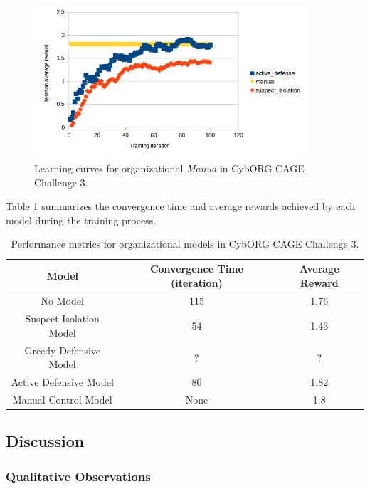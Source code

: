 \documentclass[conference]{IEEEtran}
\begin{document}
\begin{figure}[ht]
    \centering
    \includegraphics[width=0.9\textwidth]{figures/learning_curves.png}
    \caption{Learning curves for organizational \textit{Manua} in CybORG CAGE Challenge 3.}
    \label{fig:learning_curves}
\end{figure}

Table \ref{tab:results} summarizes the convergence time and average rewards achieved by each model during the training process.

\begin{table}[ht]
    \centering
    \begin{tabular}{|c|c|c|}
        \hline
        Model & Convergence Time (iteration) & Average Reward \\
        \hline
        No Model & 115 & 1.76           \\
        Suspect Isolation Model & 54 & 1.43           \\
        Greedy Defensive Model  & ? & ?       \\
        Active Defensive Model  & 80 & 1.82           \\
        Manual Control Model    & None & 1.8 \\
        \hline
    \end{tabular}
    \caption{Performance metrics for organizational models in CybORG CAGE Challenge 3.}
    \label{tab:results}
\end{table}

\subsection{Discussion}

\subsubsection{Qualitative Observations}
\end{document}
